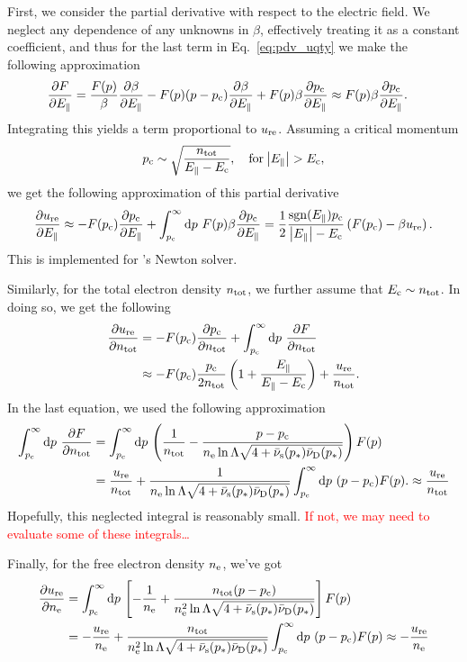 \documentclass{notes}
\newcommand{\ure}{u_{\rm re}}
\newcommand{\pc}{p_{\rm c}}
\newcommand{\lnL}{\ln\Lambda}
\newcommand{\E}{E_\parallel}
\newcommand{\Ec}{E_{\rm c}}
\newcommand{\nuS}{\bar{\nu}_{\rm s}}
\newcommand{\nuD}{\bar{\nu}_{\rm D}}
\newcommand{\ntot}{n_{\rm tot}}
\renewcommand{\ne}{n_{\rm e}}
\DeclareMathOperator{\sign}{sgn}
\begin{document}
	First, we consider the partial derivative with respect to the electric field.
	We neglect any dependence of any unknowns in $\beta$, effectively treating it as a constant coefficient, and thus for the last term in Eq.~\eqref{eq:pdv_uqty} we make the following approximation
	\begin{align}
		\pdv{F}{\E}
		&=\frac{F(p)}{\beta}\pdv{\beta}{\E}-F(p)(p-\pc)\pdv{\beta}{\E} + F(p)\beta\pdv{\pc}{\E}
		\approx F(p)\beta\pdv{\pc}{\E}.
	\end{align}
	Integrating this yields a term proportional to $\ure$.
	Assuming a critical momentum
	\begin{equation}
		\pc\sim\sqrt{\frac{\ntot}{\E-\Ec}},\quad{\rm for}\:\abs{\E}>\Ec,
	\end{equation}
	we get the following approximation of this partial derivative
	\begin{align}
		\label{eq:pdv_E}
		\pdv{\ure}{\E}
		\approx-F(\pc)\pdv{\pc}{\E}+\int_{\pc}^\infty\dd{p}\,F(p)\beta\pdv{\pc}{\E}
		=\frac{1}{2}\frac{\sign(\E)\pc}{\abs{\E}-\Ec}\left(F(\pc)-\beta\ure\right).
	\end{align}
	This is implemented for \DREAM's Newton solver.

	Similarly, for the total electron density $\ntot$, we further assume that $\Ec\sim\ntot$.
	In doing so, we get the following
	\begin{align}
		\pdv{\ure}{\ntot}
		&=-F(\pc)\pdv{\pc}{\ntot}+\int_{\pc}^\infty\dd{p}\,\pdv{F}{\ntot}\\
		&\approx-F(\pc)\frac{\pc}{2\ntot}\left(1+\frac{{\E}}{\E-\Ec}\right)+\frac{\ure}{\ntot}.
	\end{align}
	In the last equation, we used the following approximation
	\begin{align}
		\int_{\pc}^\infty\dd{p}\,\pdv{F}{\ntot}
		&=\int_{\pc}^\infty\dd{p}\,\left(\frac{1}{\ntot}-\frac{p-\pc}{\ne\lnL\sqrt{4+\nuS(p_*)\nuD(p_*)}}\right)F(p)\\
		&=\frac{\ure}{\ntot}+\frac{1}{\ne\lnL\sqrt{4+\nuS(p_*)\nuD(p_*)}}\int_{\pc}^\infty\dd{p}\,(p-\pc)F(p).
		\approx\frac{\ure}{\ntot}
	\end{align}
	Hopefully, this neglected integral is reasonably small. \textcolor{red}{If not, we may need to evaluate some of these integrals\dots}

	Finally, for the free electron density $\ne$, we've got
	\begin{align}
		\pdv{\ure}{\ne}
		&=\int_{\pc}^\infty\dd{p}\,\left[-\frac{1}{\ne}+\frac{\ntot(p-\pc)}{\ne^2\lnL\sqrt{4+\nuS(p_*)\nuD(p_*)}}\right]F(p)\\
		&=-\frac{\ure}{\ne}+\frac{\ntot}{\ne^2\lnL\sqrt{4+\nuS(p_*)\nuD(p_*)}}\int_{\pc}^\infty\dd{p}\,(p-\pc)F(p)
		\approx-\frac{\ure}{\ne}
	\end{align}
\end{document}

